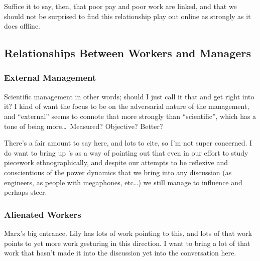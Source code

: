 \documentclass{sigchi}
\begin{document}
Suffice it to say, then, that poor pay and poor work are linked,
and that we should not be surprised to find this relationship play out online as strongly as it does offline.






\subsection{Relationships Between Workers and Managers}\label{sec:relationships}


\subsubsection{External Management}
\itshape

Scientific management in other words; should I just call it that and get right into it?
I kind of want the focus to be on the adversarial nature of the management,
and ``external'' seems to connote that more strongly than ``scientific'',
which has a tone of being more\dots~Measured? Objective? Better?

There's a fair amount to say here, and lots to cite, so I'm not super concerned.
I do want to bring up \citeauthor{storiesIraniSilberman}'s
 \cite{storiesIraniSilberman}
as a way of pointing out that even in our effort to study piecework ethnographically,
and despite our attempts to be reflexive and conscientious of
the power dynamics that we bring into any discussion
(as engineers, as people with megaphones, etc\dots)
we still manage to influence and perhaps steer.

\upshape



\subsubsection{Alienated Workers}
\itshape

Marx's big entrance. Lily has lots of work pointing to this, and
lots of that work points to yet more work gesturing in this direction.
I want to bring a lot of that work
that hasn't made it into the discussion yet
into the conversation here.
\end{document}
